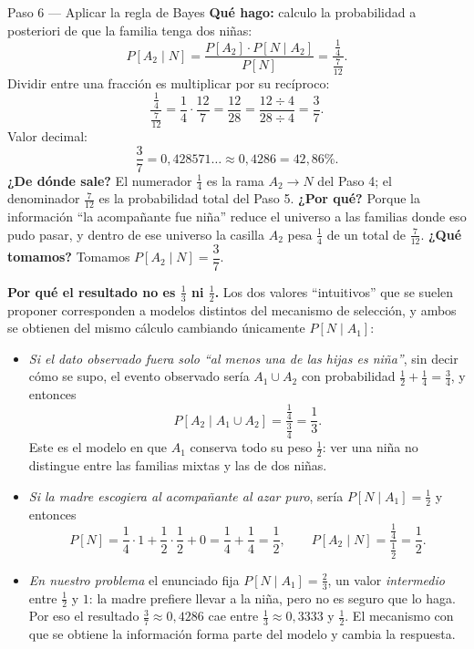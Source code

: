 \documentclass[11pt]{article}
\begin{document}
\begin{sol}
\begin{paso}{Paso 6 --- Aplicar la regla de Bayes}
\textbf{Qu\'e hago:} calculo la probabilidad a posteriori de que la familia tenga dos ni\~nas:
\[
P[A_2\mid N]=\frac{P[A_2]\cdot P[N\mid A_2]}{P[N]}=\frac{\tfrac14}{\tfrac{7}{12}} .
\]
Dividir entre una fracci\'on es multiplicar por su rec\'iproco:
\[
\frac{\tfrac14}{\tfrac{7}{12}}=\frac14\cdot\frac{12}{7}=\frac{12}{28}=\frac{12\div 4}{28\div 4}=\frac{3}{7}.
\]
Valor decimal:
\[
\frac37=0{,}428571\ldots\approx 0{,}4286 = 42{,}86\% .
\]
\textbf{¿De d\'onde sale?} El numerador $\tfrac14$ es la rama $A_2\to N$ del Paso 4; el denominador $\tfrac{7}{12}$ es la probabilidad total del Paso 5.
\textbf{¿Por qu\'e?} Porque la informaci\'on ``la acompa\~nante fue ni\~na'' reduce el universo a las familias donde eso pudo pasar, y dentro de ese universo la casilla $A_2$ pesa $\tfrac14$ de un total de $\tfrac{7}{12}$.
\textbf{¿Qu\'e tomamos?} Tomamos $P[A_2\mid N]=\dfrac{3}{7}$.
\end{paso}

\begin{nota}
\textbf{Por qu\'e el resultado no es $\tfrac13$ ni $\tfrac12$.} Los dos valores ``intuitivos'' que se suelen proponer corresponden a modelos distintos del mecanismo de selecci\'on, y ambos se obtienen del mismo c\'alculo cambiando \'unicamente $P[N\mid A_1]$:
\begin{itemize}[leftmargin=1.4em]
\item \emph{Si el dato observado fuera solo ``al menos una de las hijas es ni\~na''}, sin decir c\'omo se supo, el evento observado ser\'ia $A_1\cup A_2$ con probabilidad $\tfrac12+\tfrac14=\tfrac34$, y entonces
\[
P[A_2\mid A_1\cup A_2]=\frac{\tfrac14}{\tfrac34}=\frac13 .
\]
Este es el modelo en que $A_1$ conserva todo su peso $\tfrac12$: ver una ni\~na no distingue entre las familias mixtas y las de dos ni\~nas.
\item \emph{Si la madre escogiera al acompa\~nante al azar puro}, ser\'ia $P[N\mid A_1]=\tfrac12$ y entonces
\[
P[N]=\frac14\cdot 1+\frac12\cdot\frac12+0=\frac14+\frac14=\frac12,
\qquad
P[A_2\mid N]=\frac{\tfrac14}{\tfrac12}=\frac12 .
\]
\item \emph{En nuestro problema} el enunciado fija $P[N\mid A_1]=\tfrac23$, un valor \emph{intermedio} entre $\tfrac12$ y $1$: la madre prefiere llevar a la ni\~na, pero no es seguro que lo haga. Por eso el resultado $\tfrac37\approx 0{,}4286$ cae entre $\tfrac13\approx 0{,}3333$ y $\tfrac12$. El mecanismo con que se obtiene la informaci\'on forma parte del modelo y cambia la respuesta.
\end{itemize}
\end{nota}

\end{sol}
\end{document}
